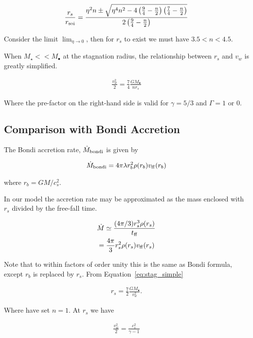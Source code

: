 \documentclass[usenatbib,fleqn]{mn2e}
\newcommand{\Mdotb}{\dot{M}_{\rm bondi}}
\newcommand{\rs}{r_s}
\newcommand{\rb}{r_b}
\newcommand{\vw}{v_w}
\newcommand{\kew}{\frac{v_w^2}{2}}
\newcommand{\Mstar}{M_{\star}}
\newcommand{\Mbh}[1][]{M_{\bullet#1}}
\newcommand{\soi}{\rm soi}
\newcommand{\ff}{\rm ff}
\newcommand{\rsoi}{r_{\soi}}
\newcommand{\x}{\frac{r_s}{\rsoi}}
\begin{document}
\begin{align}
\x=\frac{\eta^2 n \pm \sqrt{\eta^4 n^2 -4 \left(\frac{9}{4}-\frac{n}{2}\right) \left(\frac{7}{4}-\frac{n}{2}\right)}}{2\left(\frac{9}{4}-\frac{n}{2}\right)}
\end{align}

Consider the limit $\lim_{\eta \to 0}$, then for $\rs$ to exist we must have $3.5<n<4.5$.

When $\Mstar << \Mbh$ at the stagnation radius, the relationship between $\rs$ and $\vw$ is greatly simplified. 

\begin{align}
\kew=\frac{7}{4}\frac{G \Mbh}{n \rs}
\label{eq:stag_simple}
\end{align}

Where the pre-factor on the right-hand side is valid for $\gamma=5/3$ and $\Gamma=1$ or 0.  


\subsection{Comparison with Bondi Accretion}
The Bondi accretion rate, $\Mdotb$ is given by 

\begin{align}
\Mdotb=4\pi \lambda r_b^2 \rho(r_b) v_{\rm ff}(r_b)
\end{align}

where $r_b=G M/c_s^2$.

In our model the accretion rate may be approximated as the mass enclosed with $\rs$ divided by the free-fall time.

\begin{align}
&\dot{M}\simeq\frac{(4 \pi/3) \rs^3 \rho(\rs)}{t_{\ff}}\\
&=\frac{4 \pi}{3} \rs^2 \rho(\rs) v_{\ff}(\rs)
\end{align}

Note that to within factors of order unity this is the same as Bondi formula, except $\rb$ is replaced by $\rs$. 
From Equation~\ref{eq:stag_simple}

\begin{align}
\rs=\frac{7}{2}\frac{G \Mbh}{\vw^2}.
\label{eq:rs_simple}
\end{align}

Where have set $n=1$.  At $\rs$ we have

\begin{align}
\kew=\frac{c_s^2}{\gamma-1}
\end{align}
\end{document}
